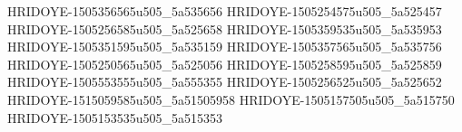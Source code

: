 HRIDOYE-1505356565u505_5a535656
HRIDOYE-1505254575u505_5a525457
HRIDOYE-1505256585u505_5a525658
HRIDOYE-1505359535u505_5a535953
HRIDOYE-1505351595u505_5a535159
HRIDOYE-1505357565u505_5a535756
HRIDOYE-1505250565u505_5a525056
HRIDOYE-1505258595u505_5a525859
HRIDOYE-1505553555u505_5a555355
HRIDOYE-1505256525u505_5a525652
HRIDOYE-1515059585u505_5a51505958
HRIDOYE-1505157505u505_5a515750
HRIDOYE-1505153535u505_5a515353
